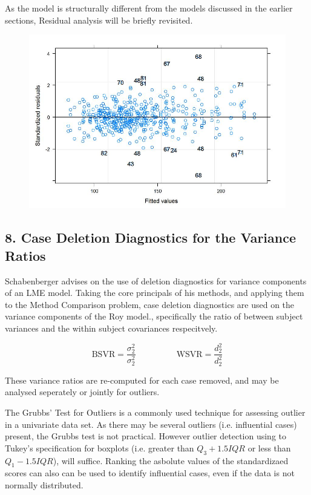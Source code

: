 \documentclass[12pt, a4paper]{report}
\theoremstyle{plain}
\theoremstyle{definition}
\theoremstyle{remark}
\begin{document}
As the model is structurally different from the models discussed in the earlier sections, Residual analysis will be briefly revisited.
\begin{figure}[h!]
	\centering
	\includegraphics[width=0.7\linewidth]{images/Residuals-JS-Roy}
	\caption{}
	\label{fig:Residuals-JS-Roy}
\end{figure}

\newpage
\subsection*{8. Case Deletion Diagnostics for the Variance Ratios}

Schabenberger advises on the use of deletion diagnostics for variance components of an LME model.
Taking the core principals of his methods, and applying them to the Method Comparison problem, case deletion diagnostics are used on the variance components of the Roy model., specifically the ratio of between subject variances and the within subject covariances respecitvely.


\[ \mbox{BSVR} = \frac{\sigma^2_2}{\sigma^2_2} \phantom{makespace}  \mbox{WSVR} = \frac{d^2_2}{d^2_2} \]

These variance ratios are re-computed for each case removed, and may be analysed seperately or jointly for outliers. 

The Grubbs' Test for Outliers is a commonly used technique for assessing outlier in a univariate data set. As there may be several outliers (i.e. influential cases) present, the Grubbs test is not practical. However outlier detection using to Tukey's 
specification for boxplots (i.e. greater than $Q_3 +1.5 IQR$ or less than $Q_1 - 1.5 IQR$), will suffice. Ranking the asbolute values of the standardizaed scores can also can be used to identify influential cases, even if the data is not normally distributed.
\end{document}
